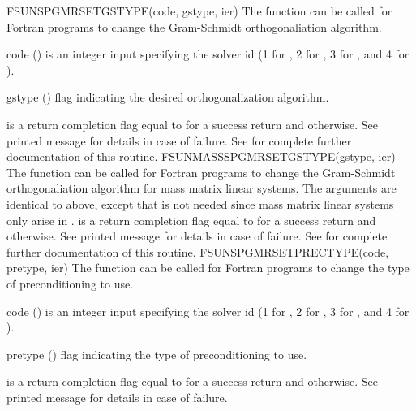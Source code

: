 {
  FSUNSPGMRSETGSTYPE(code, gstype, ier)
}
{
  The function  can be called for Fortran
  programs to change the Gram-Schmidt orthogonaliation algorithm.
}
{
  \begin{args}[gstype]
  \item[code] ()
    is an integer input specifying the solver id (1 for {\cvode}, 2
    for {\ida}, 3 for {\kinsol}, and 4 for {\arkode}).
  \item[gstype] ()
    flag indicating the desired orthogonalization algorithm.
  \end{args}
}
{
   is a  return completion flag equal to  for a success
  return and  otherwise. See printed message for details in case
  of failure.
}
{
  See  for complete further documentation of
  this routine. 
}
{
  FSUNMASSSPGMRSETGSTYPE(gstype, ier)
}
{
  The function  can be called for Fortran
  programs to change the Gram-Schmidt orthogonaliation algorithm for
  mass matrix linear systems.
}
{
  The arguments are identical to  above, except that
   is not needed since mass matrix linear systems only arise
  in {\arkode}.
}
{
   is a  return completion flag equal to  for a success
  return and  otherwise. See printed message for details in case
  of failure.
}
{
  See  for complete further documentation of
  this routine. 
}
{
  FSUNSPGMRSETPRECTYPE(code, pretype, ier)
}
{
  The function  can be called for Fortran
  programs to change the type of preconditioning to use.
}
{
  \begin{args}[pretype]
  \item[code] ()
    is an integer input specifying the solver id (1 for {\cvode}, 2
    for {\ida}, 3 for {\kinsol}, and 4 for {\arkode}).
  \item[pretype] ()
    flag indicating the type of preconditioning to use.
  \end{args}
}
{
   is a  return completion flag equal to  for a success
  return and  otherwise. See printed message for details in case
  of failure.
}
